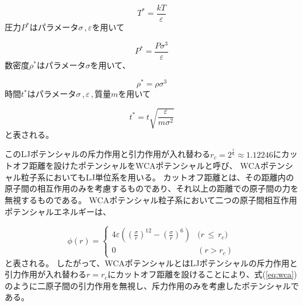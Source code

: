 \documentclass[titlepage]{jsreport}
\begin{document}
\large
\begin{equation}
T^*=\frac{kT}{\varepsilon}\label{eq:T}
\end{equation}
\normalsize
圧力$P^*$はパラメータ${\sigma}$\,,\,${\varepsilon}$を用いて

\large
\begin{equation}
P^*=\frac{P\sigma^3}{\varepsilon}\label{eq:P}
\end{equation}
\normalsize
数密度$\rho^*$はパラメータ$\sigma$を用いて、

\large
\begin{equation}
\rho^*=\rho{\sigma}^3\label{eq:rho}
\end{equation}
\normalsize
時間$t^*$はパラメータ${\sigma}$\,,\,${\varepsilon}$\,,\,質量$m$を用いて

\large
\begin{equation}
t^*=t\sqrt{\frac{\varepsilon}{m{\sigma}^2}}\label{eq:time}
\end{equation}
\normalsize
と表される。

このLJポテンシャルの斥力作用と引力作用が入れ替わる$r_c=2^{\frac{1}{6}}{\approx}1.12246$にカットオフ距離を設けたポテンシャルをWCAポテンシャルと呼び、
WCAポテンシャル粒子系においてもLJ単位系を用いる。
カットオフ距離とは、その距離内の原子間の相互作用のみを考慮するものであり、それ以上の距離での原子間の力を無視するものである\cite{WATANABE20191}。
WCAポテンシャル粒子系において二つの原子間相互作用ポテンシャルエネルギーは、

\large
\begin{equation}
\phi(r) = \left\{ \begin{array}{ll}
    4{\varepsilon}\left(\left(\frac{\sigma}{r}\right)^{12}-\left(\frac{\sigma}{r}\right)^6\right) & (r\,{\leq}\,{r_c)} \\
    0 & (r>r_c)\label{eq:wca}
\end{array} \right.
\end{equation}
\normalsize
と表される\cite{doi:10.1063/1.2176675}。
したがって、WCAポテンシャルとはLJポテンシャルの斥力作用と引力作用が入れ替わる$r=r_c$にカットオフ距離を設けることにより、式(\ref{eq:wca})のように二原子間の引力作用を無視し、斥力作用のみを考慮したポテンシャルである。
\end{document}
